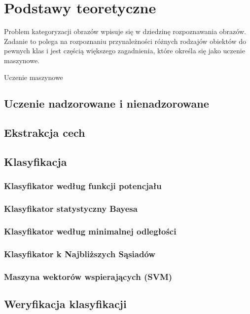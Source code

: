 \chapter{Podstawy teoretyczne}

Problem kategoryzacji obrazów wpisuje się w dziedzinę rozpoznawania obrazów. Zadanie to polega na rozpoznaniu przynależności różnych rodzajów obiektów do pewnych klas\cite{Tad91} i jest częścią większego zagadnienia, które określa się jako uczenie maszynowe.

Uczenie maszynowe 



\section{Uczenie nadzorowane i nienadzorowane}


\section{Ekstrakcja cech}

\section{Klasyfikacja}

	\subsection{Klasyfikator według funkcji potencjału}
	
	\subsection{Klasyfikator statystyczny Bayesa}
	
	\subsection{Klasyfikator według minimalnej odległości}
	
	\subsection{Klasyfikator k Najbliższych Sąsiadów}

	\subsection{Maszyna wektorów wspierających (SVM)}
	
\section{Weryfikacja klasyfikacji}